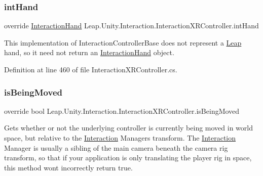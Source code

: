 \subsubsection{\texorpdfstring{intHand}{intHand}}
{\footnotesize\ttfamily override \mbox{\hyperlink{class_leap_1_1_unity_1_1_interaction_1_1_interaction_hand}{Interaction\+Hand}} Leap.\+Unity.\+Interaction.\+Interaction\+X\+R\+Controller.\+int\+Hand\hspace{0.3cm}{\ttfamily [get]}}



This implementation of Interaction\+Controller\+Base does not represent a \mbox{\hyperlink{namespace_leap_1_1_unity_1_1_leap}{Leap}} hand, so it need not return an \mbox{\hyperlink{class_leap_1_1_unity_1_1_interaction_1_1_interaction_hand}{Interaction\+Hand}} object. 



Definition at line 460 of file Interaction\+X\+R\+Controller.\+cs.

\mbox{\label{class_leap_1_1_unity_1_1_interaction_1_1_interaction_x_r_controller_a362ab5e9ffb5ac5046a869668670b40c}} 
\subsubsection{\texorpdfstring{isBeingMoved}{isBeingMoved}}
{\footnotesize\ttfamily override bool Leap.\+Unity.\+Interaction.\+Interaction\+X\+R\+Controller.\+is\+Being\+Moved\hspace{0.3cm}{\ttfamily [get]}}



Gets whether or not the underlying controller is currently being moved in world space, but relative to the \mbox{\hyperlink{namespace_leap_1_1_unity_1_1_interaction}{Interaction}} Manager\textquotesingle{}s transform. The \mbox{\hyperlink{namespace_leap_1_1_unity_1_1_interaction}{Interaction}} Manager is usually a sibling of the main camera beneath the camera rig transform, so that if your application is only translating the player rig in space, this method won\textquotesingle{}t incorrectly return true. 



